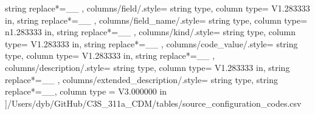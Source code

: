 \begin{landscape}
{            string replace*={_}{\_}
        },
    columns/field/.style={
            string type, 
            column type= V{1.283333 in}, 
            string replace*={_}{\_}
        },
    columns/field_name/.style={
            string type, 
            column type= n{1.283333 in}, 
            string replace*={_}{\_}
        },
    columns/kind/.style={
            string type, 
            column type= V{1.283333 in}, 
            string replace*={_}{\_}
        },
    columns/code_value/.style={
            string type, 
            column type= V{1.283333 in}, 
            string replace*={_}{\_}
        },
    columns/description/.style={
            string type, 
            column type= V{1.283333 in}, 
            string replace*={_}{\_}
        },
    columns/extended_description/.style={
            string type, 
            string replace*={_}{\_},
            column type = V{3.000000 in}
        }
    ]{/Users/dyb/GitHub/C3S_311a_CDM/tables/source_configuration_codes.csv}
\end{landscape}
